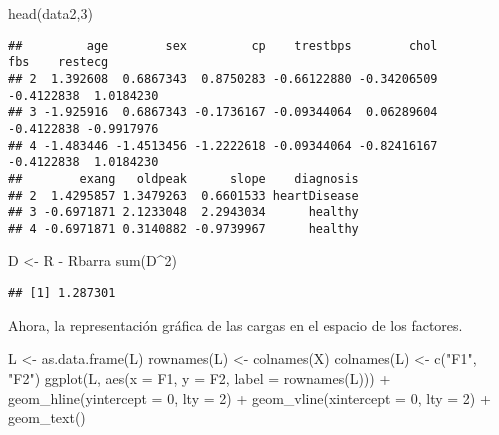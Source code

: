 \documentclass[
]{article}
\newenvironment{Shaded}{\begin{snugshade}}{\end{snugshade}}
\newcommand{\AttributeTok}[1]{\textcolor[rgb]{0.77,0.63,0.00}{#1}}
\newcommand{\DecValTok}[1]{\textcolor[rgb]{0.00,0.00,0.81}{#1}}
\newcommand{\FunctionTok}[1]{\textcolor[rgb]{0.00,0.00,0.00}{#1}}
\newcommand{\NormalTok}[1]{#1}
\newcommand{\OtherTok}[1]{\textcolor[rgb]{0.56,0.35,0.01}{#1}}
\newcommand{\SpecialCharTok}[1]{\textcolor[rgb]{0.00,0.00,0.00}{#1}}
\newcommand{\StringTok}[1]{\textcolor[rgb]{0.31,0.60,0.02}{#1}}
\begin{document}
\begin{Shaded}
\begin{Highlighting}[]
\FunctionTok{head}\NormalTok{(data2,}\DecValTok{3}\NormalTok{)}
\end{Highlighting}
\end{Shaded}

\begin{verbatim}
##         age        sex         cp    trestbps        chol        fbs    restecg
## 2  1.392608  0.6867343  0.8750283 -0.66122880 -0.34206509 -0.4122838  1.0184230
## 3 -1.925916  0.6867343 -0.1736167 -0.09344064  0.06289604 -0.4122838 -0.9917976
## 4 -1.483446 -1.4513456 -1.2222618 -0.09344064 -0.82416167 -0.4122838  1.0184230
##        exang   oldpeak      slope    diagnosis
## 2  1.4295857 1.3479263  0.6601533 heartDisease
## 3 -0.6971871 2.1233048  2.2943034      healthy
## 4 -0.6971871 0.3140882 -0.9739967      healthy
\end{verbatim}

\begin{Shaded}
\begin{Highlighting}[]
\NormalTok{D }\OtherTok{\textless{}{-}}\NormalTok{ R }\SpecialCharTok{{-}}\NormalTok{ Rbarra}
\FunctionTok{sum}\NormalTok{(D}\SpecialCharTok{\^{}}\DecValTok{2}\NormalTok{)}
\end{Highlighting}
\end{Shaded}

\begin{verbatim}
## [1] 1.287301
\end{verbatim}

Ahora, la representación gráfica de las cargas en el espacio de los
factores.

\begin{Shaded}
\begin{Highlighting}[]
\NormalTok{L }\OtherTok{\textless{}{-}} \FunctionTok{as.data.frame}\NormalTok{(L)}
\FunctionTok{rownames}\NormalTok{(L) }\OtherTok{\textless{}{-}} \FunctionTok{colnames}\NormalTok{(X)}
\FunctionTok{colnames}\NormalTok{(L) }\OtherTok{\textless{}{-}} \FunctionTok{c}\NormalTok{(}\StringTok{"F1"}\NormalTok{, }\StringTok{"F2"}\NormalTok{)}
\FunctionTok{ggplot}\NormalTok{(L, }\FunctionTok{aes}\NormalTok{(}\AttributeTok{x =}\NormalTok{ F1, }\AttributeTok{y =}\NormalTok{ F2, }\AttributeTok{label =} \FunctionTok{rownames}\NormalTok{(L))) }\SpecialCharTok{+}
\FunctionTok{geom\_hline}\NormalTok{(}\AttributeTok{yintercept =} \DecValTok{0}\NormalTok{, }\AttributeTok{lty =} \DecValTok{2}\NormalTok{) }\SpecialCharTok{+}
\FunctionTok{geom\_vline}\NormalTok{(}\AttributeTok{xintercept =} \DecValTok{0}\NormalTok{, }\AttributeTok{lty =} \DecValTok{2}\NormalTok{) }\SpecialCharTok{+}
\FunctionTok{geom\_text}\NormalTok{()}
\end{Highlighting}
\end{Shaded}
\end{document}
